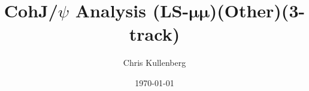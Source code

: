 \title{CohJ/$\psi$ Analysis (\textbf{LS}-$\boldsymbol{\mu\mu}$)(\textbf{Other})(\textbf{3-track})}
\author{Chris Kullenberg}
\date{\today}
